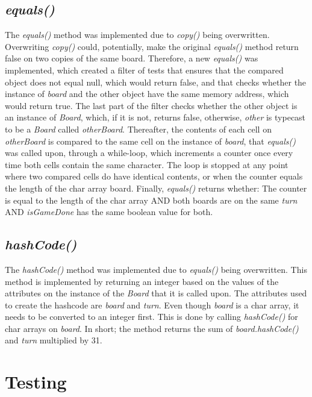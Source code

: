 \documentclass[12pt, a4paper]{article}
\begin{document}
\subsection{\emph{equals()}}
The \emph{equals()} method was implemented due to \emph{copy()} being overwritten. Overwriting \emph{copy()} could, potentially, make the original \emph{equals()} method return false on two copies of the same board. Therefore, a new \emph{equals()} was implemented, which created a filter of tests that ensures that the compared object does not equal null, which would return false, and that checks whether the instance of \emph{board} and the other object have the same memory address, which would return true. The last part of the filter checks whether the other object is an instance of \emph{Board}, which, if it is not, returns false, otherwise, \emph{other} is typecast to be a \emph{Board} called \emph{otherBoard}. Thereafter, the contents of each cell on \emph{otherBoard} is compared to the same cell on the instance of \emph{board}, that \emph{equals()} was called upon, through a while-loop, which increments a counter once every time both cells contain the same character. The loop is stopped at any point where two compared cells do have identical contents, or when the counter equals the length of the char array board. Finally, \emph{equals()} returns whether: The counter is equal to the length of the char array AND both boards are on the same \emph{turn} AND \emph{isGameDone} has the same boolean value for both.

\newpage

\subsection{\emph{hashCode()}}
The \emph{hashCode()} method was implemented due to \emph{equals()} being overwritten. This method is implemented by returning an integer based on the values of the attributes on the instance of the \emph{Board} that it is called upon. The attributes used to create the hashcode are \emph{board} and \emph{turn}. Even though \emph{board} is a char array, it needs to be converted to an integer first. This is done by calling \emph{hashCode()} for char arrays on \emph{board}. In short; the method returns the sum of \emph{board.hashCode()} and \emph{turn} multiplied by 31.

\newpage

\section{Testing}
\end{document}
